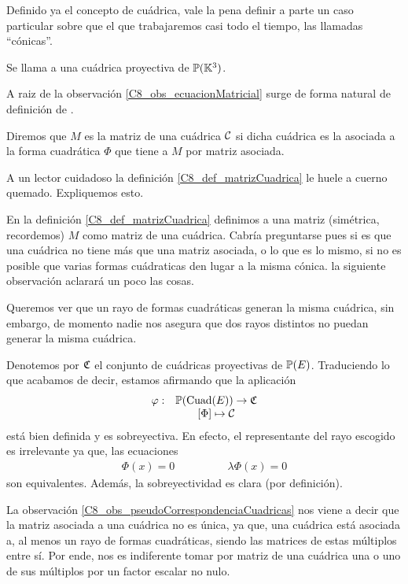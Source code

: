 Definido ya el concepto de cuádrica, vale la pena definir a parte un caso particular sobre que el que trabajaremos casi todo el tiempo, las llamadas ``cónicas''.
\begin{defi}[Cónica]
	Se llama  a una cuádrica proyectiva de $\mathbb{P}(\mathbb{K}^3)$.
\end{defi}
A raiz de la observación \ref{C8_obs_ecuacionMatricial} surge de forma natural de definición de .
\begin{defi}
	\label{C8_def_matrizCuadrica}
	Diremos que $M$ es la matriz de una cuádrica $\mathcal{C}$ si dicha cuádrica es la asociada a la forma cuadrática $\Phi$ que tiene a $M$ por matriz asociada.
\end{defi}
A un lector cuidadoso la definición \ref{C8_def_matrizCuadrica} le huele a cuerno quemado. Expliquemos esto.

En la definición \ref{C8_def_matrizCuadrica} definimos a una matriz (simétrica, recordemos) $M$ como  matriz de una cuádrica. Cabría preguntarse pues si es que una cuádrica no tiene más que una matriz asociada, o lo que es lo mismo, si no es posible que varias formas cuádraticas den lugar a la misma cónica. la siguiente observación aclarará un poco las cosas.
\begin{obs}
	\label{C8_obs_pseudoCorrespondenciaCuadricas}
	Queremos ver que un rayo de formas cuadráticas generan la misma cuádrica, sin embargo, de momento nadie nos asegura que dos rayos distintos no puedan generar la misma cuádrica.
	
	Denotemos por $\mathfrak{C}$ el conjunto de cuádricas proyectivas de $\mathbb{P}(E)$. Traduciendo lo que acabamos de decir, estamos afirmando que la aplicación
	\[\begin{array}{cc}
	\varphi:&\mathbb{P}(\mathrm{Cuad}(E))\to\mathfrak{C}\\
	& \left [ \Phi \right ]\mapsto \mathcal{C}
	\end{array}\] está bien definida y es sobreyectiva. En efecto, el representante del rayo escogido es irrelevante ya que, las ecuaciones
	\[\begin{array}{cc}
	\Phi(x)=0\qquad&\qquad\lambda\Phi(x)=0
	\end{array}\]
	son equivalentes. Además, la sobreyectividad es clara (por definición).
\end{obs}
La observación \ref{C8_obs_pseudoCorrespondenciaCuadricas} nos viene a decir que la matriz asociada a una cuádrica no es única, ya que, una cuádrica está asociada a, al menos un rayo de formas cuadráticas, siendo las matrices de estas múltiplos entre sí. Por ende, nos es indiferente tomar por matriz de una cuádrica una o uno de sus múltiplos por un factor escalar no nulo.

